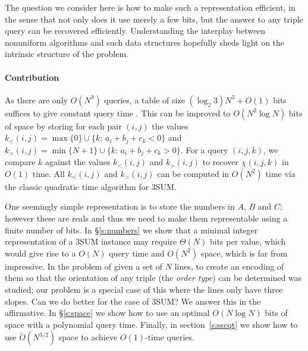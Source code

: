 The question we consider here is how to make such a representation efficient,
in the sense that not only does it use merely a few bits, but the answer to any
triple query can be recovered efficiently. Understanding the interplay between
nonuniform algorithms and such data structures hopefully sheds light on the
intrinsic structure of the problem.

\paragraph{Contribution}

As there are only $O(N^3)$ queries, a table
of size $(\log_2 3) N^3 + O(1)$ bits suffices to give constant query time
\cite{DPT10}. This can be improved to $O(N^2\log N)$ bits of space by
storing for each pair $(i,j)$ the values
\(k_<(i,j) = \max \{ 0\}\cup \{k \colon\, a_i + b_j + c_k < 0\}\) and
\(k_>(i,j) = \min \{ N+1\}\cup \{k \colon\, a_i + b_j + c_k > 0\}\).
For a query \((i,j,k)\), we compare \(k\) against the values \(k_<(i,j)\) and \(k_>(i,j)\)
to recover \(\chi(i,j,k)\) in \(O(1)\) time. All \(k_<(i,j)\) and \(k_>(i,j)\)
can be computed in \(O(N^2)\) time via the classic quadratic time algorithm for
3SUM.

One seemingly simple representation is to store the numbers in $A$, $B$ and
$C$; however these are reals and thus we need to make them representable using
a finite number of bits.
In \S\ref{s:numbers} we show that a minimal integer representation of a
3SUM instance may require $\Theta(N)$ bits per value, which would give
rise to a $O(N)$ query time and $O(N^2)$ space, which is far from
impressive.
In \cite{CCILO18} the problem of given a set of $N$ lines, to create an
encoding of them so that the orientation of any triple (the \emph{order type})
can be determined was studied; our problem is a special case of this where the
lines only have three slopes.
Can we do better for the case of 3SUM? We answer this in the affirmative.
In \S\ref{s:space} we show how to use an optimal $O(N \log N)$ bits of
space with a polynomial query time. Finally, in section~\ref{s:sscqt} we show
how to use $\tilde{O}(N^{3/2})$ space to achieve $O(1)$-time queries.
